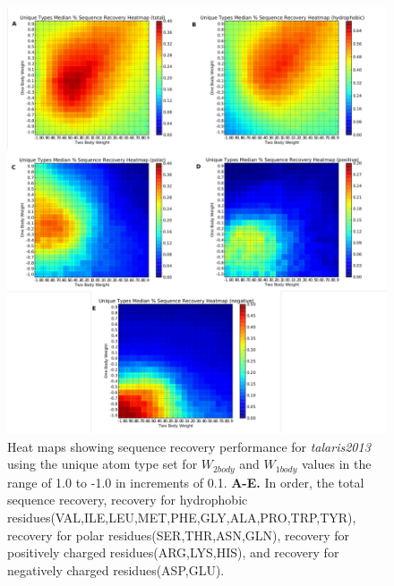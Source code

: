 \begin{figure}[hbtp]
  \includegraphics[width=\linewidth]{Figures/unique_types_broad_gridsearch_classes.pdf}
  \caption{Heat maps showing sequence recovery performance for \textit{talaris2013} using the unique atom type set for $W_{2body}$ and $W_{1body}$ values in the range of 1.0 to -1.0 in increments of 0.1.
  \textbf{A-E.} In order, the total sequence recovery, recovery for hydrophobic residues(VAL,ILE,LEU,MET,PHE,GLY,ALA,PRO,TRP,TYR), recovery for polar residues(SER,THR,ASN,GLN), recovery for positively charged residues(ARG,LYS,HIS), and recovery for negatively charged residues(ASP,GLU).}
  \label{fig:gridsearch_classes}
\end{figure}

